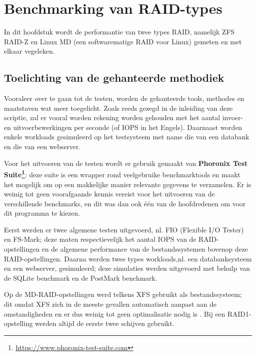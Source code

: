 

\chapter{Benchmarking van RAID-types}
\label{ch:h8}

In dit hoofdstuk wordt de performantie van twee types RAID, namelijk ZFS RAID-Z en Linux MD (een softwarematige RAID voor Linux) gemeten en met elkaar vegeleken.

\section{Toelichting van de gehanteerde methodiek}

Vooraleer over te gaan tot de testen, worden de gehanteerde tools, methodes en maatstaven wat meer toegelicht. Zoals reeds gezegd in de inleiding van deze scriptie, zal er vooral worden rekening worden gehouden met het aantal invoer- en uitvoerbewerkingen per seconde (of IOPS in het Engels). Daarnaast worden enkele workloads gesimuleerd op het testsysteem met name die van een databank en die van een webserver.  

Voor het uitvoeren van de testen wordt er gebruik gemaakt van \textbf{Phoronix Test Suite\footnote{\url{https://www.phoronix-test-suite.com}}}: deze suite is een wrapper rond veelgebruike benchmarktools en maakt het mogelijk om op een makkelijke manier relevante gegevens te verzamelen. Er is weinig tot geen voorafgaande kennis vereist voor het uitvoeren van de verschillende benchmarks, en dit was dan ook één van de hoofdredenen om voor dit programma te kiezen. 

Eerst werden er twee algemene testen uitgevoerd, nl. FIO (Flexible I/O Tester) en FS-Mark; deze maten respectievelijk het aantal IOPS van de RAID-opstellingen en de algemene performance van de bestandssystemen bovenop deze RAID-opstellingen. Daarna werden twee types workloads,nl. een databanksysteem en een webserver, gesimuleerd; deze simulaties werden uitgevoerd met behulp van de SQLite benchmark en de PostMark benchmark.

Op de MD-RAID-opstellingen werd telkens XFS gebruikt als bestandssysteem; dit omdat XFS zich in de meeste gevallen automatisch aanpast aan de omstandigheden en er dus weinig tot geen optimalisatie nodig is \autocite{XFSCommunity2016}. Bij een RAID1-opstelling werden altijd de eerste twee schijven gebruikt.

